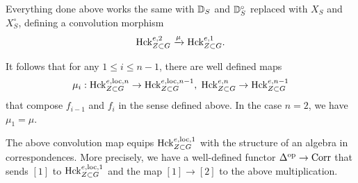  Everything done above works the same with $\mathbb D_{S}$ and $\mathbb D_{S}^{\circ}$ replaced with $X_{S}$ and $X_{S}^{\circ}$, defining a convolution morphism
 \begin{equation*}
    \textnormal{Hck}_{Z \subset G}^{e,2} \xrightarrow{\mu} \textnormal{Hck}_{Z \subset G}^{e,1}.
\end{equation*}


It follows that for any $1 \leq i \leq n-1$, there are well defined maps
\begin{equation*}
\mu_i : \mathrm{Hck}_{Z \subset G}^{e,\mathrm{loc}, n} \to \mathrm{Hck}_{Z \subset G}^{e,\mathrm{loc}, n-1}, \hspace{1mm} \mathrm{Hck}_{Z \subset G}^{e, n} \to \mathrm{Hck}_{Z \subset G}^{e, n-1}
\end{equation*}
that compose $f_{i-1}$ and $f_{i}$ in the sense defined above. In the case $n=2$, we have $\mu_{1} = \mu$.

\begin{prop}
The above convolution map equips $\mathrm{Hck}_{Z \subset G}^{e,\mathrm{loc},1}$ with the structure of an algebra in correspondences. More precisely, we have a well-defined functor $\Delta^{\textnormal{op}} \to \textnormal{Corr}$ that sends $[1]$ to $\mathrm{Hck}_{Z \subset G}^{e,\mathrm{loc},1}$ and the map $[1] \to [2]$ to the above multiplication.
\end{prop}

